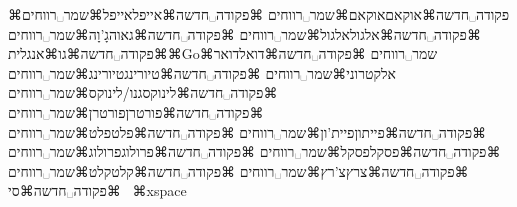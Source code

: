     
⌘פקודה␣חדשה⌘אוקאם{אוקאם⌘שמר␣רווחים}
⌘פקודה␣חדשה⌘אייפל{אייפל⌘שמר␣רווחים}
⌘פקודה␣חדשה⌘אלגול{אלגול⌘שמר␣רווחים}
⌘פקודה␣חדשה⌘גאוה{גָ'וָה⌘שמר␣רווחים}
⌘פקודה␣חדשה⌘גו{⌘אנגלית{⌘Go}⌘שמר␣רווחים}
⌘פקודה␣חדשה⌘דואל{דואר אלקטרוני⌘שמר␣רווחים}
⌘פקודה␣חדשה⌘טיורינג{טיורינג⌘שמר␣רווחים}
⌘פקודה␣חדשה⌘לינוקס{גנו/לינוקס⌘שמר␣רווחים}
⌘פקודה␣חדשה⌘פורטרן{פורטרן⌘שמר␣רווחים}
⌘פקודה␣חדשה⌘פייתון{פיית'ון⌘שמר␣רווחים}
⌘פקודה␣חדשה⌘פלט{פלט⌘שמר␣רווחים}
⌘פקודה␣חדשה⌘פסקל{פסקל⌘שמר␣רווחים}
⌘פקודה␣חדשה⌘פרולוג{פרולוג⌘שמר␣רווחים}
⌘פקודה␣חדשה⌘צרץ{צ'רץ⌘שמר␣רווחים}
⌘פקודה␣חדשה⌘קלט{קלט⌘שמר␣רווחים}
⌘פקודה␣חדשה⌘סי{%
\unskip~⌘xspace}


